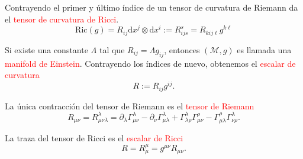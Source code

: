 \documentclass[../main]{subfiles}
\begin{document}
\begin{adjustwidth}{0pt}{-100pt}
Contrayendo el primer y último índice de un tensor de curvatura de Riemann da el \textcolor{red}{tensor de curvatura de Ricci}.
\begin{equation}
    \mathrm{Ric}(g)=R_{ij}\mathrm{d}x^j \otimes \mathrm{d}x^{i}:= R^s_{ijs}=R_{kij\ell}g^{k\ell}
\end{equation}

Si existe una constante $\Lambda$ tal que $R_{ij}=\Lambda g_{ij}$, entonces $(\mathcal{M}, g)$ es llamada una \textcolor{red}{manifold de Einstein}. Contrayendo los índices de nuevo, obtenemos el \textcolor{red}{escalar de curvatura}
\begin{equation}
    R:= R_{ij} g^{ij}.
\end{equation}

 La única contracción del tensor de Riemann es el \textcolor{red}{tensor de Riemann}
\begin{equation}
    R_{\mu\nu}=R^{\lambda}_{\mu\nu\lambda}=\partial_{\lambda}\Gamma^{\lambda}_{\mu\nu}-\partial_{\nu}\Gamma^{\lambda}_{\mu\lambda}+\Gamma^{\lambda}_{\lambda\rho}\Gamma^{\rho}_{\mu\nu}-\Gamma^{\rho}_{\mu\lambda}\Gamma^{\lambda}_{\nu\rho}.
\end{equation}

 La traza del tensor de Ricci es el \textcolor{red}{escalar de Ricci}
\begin{equation}
    R=R^{\mu}_{\mu}=g^{\mu\nu}R_{\mu\nu}.
\end{equation}
\end{adjustwidth}
\end{document}
